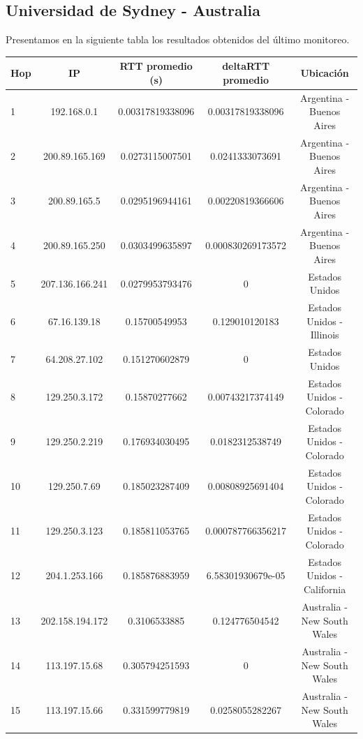 \subsection{Universidad de Sydney - Australia}
Presentamos en la siguiente tabla los resultados obtenidos del último monitoreo.

\bigskip

\begin{tabular}{ | l | c | c | c | c |}
 
  \hline                 
  Hop & IP &  RTT promedio (s)  & deltaRTT promedio & Ubicación\\
  \hline
  1  &  192.168.0.1  &  0.00317819338096  &  0.00317819338096 & Argentina - Buenos Aires\\
  \hline
  2  &  200.89.165.169  &  0.0273115007501  &  0.0241333073691 & Argentina - Buenos Aires\\
  \hline
  3  &  200.89.165.5  &  0.0295196944161  &  0.00220819366606 & Argentina - Buenos Aires\\
  \hline
  4  &  200.89.165.250  &  0.0303499635897  &  0.000830269173572 & Argentina - Buenos Aires\\
  \hline
  5  &  207.136.166.241  &  0.0279953793476  &  0 & Estados Unidos\\
  \hline
  6  &  67.16.139.18  &  0.15700549953  &  0.129010120183 & Estados Unidos - Illinois\\
  \hline
  7  &  64.208.27.102  &  0.151270602879  &  0 & Estados Unidos\\
  \hline
  8  &  129.250.3.172  &  0.15870277662  &  0.00743217374149 & Estados Unidos - Colorado\\
  \hline
  9  &  129.250.2.219  &  0.176934030495  &  0.0182312538749 & Estados Unidos - Colorado\\
  \hline
  10  &  129.250.7.69  &  0.185023287409  &  0.00808925691404 & Estados Unidos - Colorado\\
  \hline
  11  &  129.250.3.123  &  0.185811053765  &  0.000787766356217 & Estados Unidos - Colorado\\
  \hline
  12  &  204.1.253.166  &  0.185876883959  &  6.58301930679e-05 & Estados Unidos - California\\
  \hline
  13  &  202.158.194.172  &  0.3106533885  &  0.124776504542 & Australia - New South Wales\\
  \hline
  14  &  113.197.15.68  &  0.305794251593  &  0 & Australia - New South Wales\\
  \hline
  15  &  113.197.15.66  &  0.331599779819  &  0.0258055282267 & Australia - New South Wales\\

\end{tabular}
